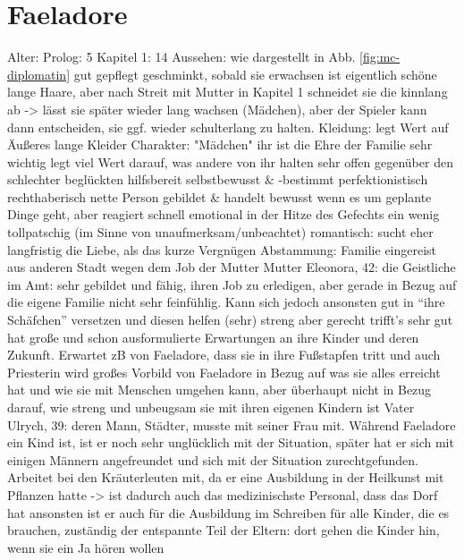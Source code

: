\section{Faeladore} \label{sec:mc-diplomatin}
\begin{outline}
	\1 Alter:
		\2 Prolog: 5
		\2 Kapitel 1: 14
	\1 Aussehen:
		\2 wie dargestellt in Abb. \ref{fig:mc-diplomatin} 
		\2 gut gepflegt 
		\2 geschminkt, sobald sie erwachsen ist
		\2 eigentlich schöne lange Haare, aber nach Streit mit Mutter in Kapitel 1 schneidet sie die kinnlang ab -> lässt sie später wieder lang wachsen (Mädchen), aber der Spieler kann dann entscheiden, sie ggf. wieder schulterlang zu halten. 
	\1 Kleidung:
		\2 legt Wert auf Äußeres
		\2 lange Kleider
	\1 Charakter:
		\2 "Mädchen"
		\2 ihr ist die Ehre der Familie sehr wichtig 
		\2 legt viel Wert darauf, was andere von ihr halten 
		\2 sehr offen gegenüber den schlechter beglückten
		\2 hilfsbereit
		\2 selbstbewusst \& -bestimmt
		\2 perfektionistisch
		\2 rechthaberisch
		\2 nette Person
		\2 gebildet \& handelt bewusst wenn es um geplante Dinge geht, aber reagiert schnell emotional in der Hitze des Gefechts
		\2 ein wenig tollpatschig (im Sinne von unaufmerksam/unbeachtet)
		\2 romantisch: sucht eher langfristig die Liebe, als das kurze Vergnügen
	\1 Abstammung:
		\2 Familie
			\3 eingereist aus anderen Stadt wegen dem Job der Mutter
		\2 Mutter Eleonora, 42:
			\3 die Geistliche im Amt: sehr gebildet und fähig, ihren Job zu erledigen, aber gerade in Bezug auf die eigene Familie nicht sehr feinfühlig. Kann sich jedoch ansonsten gut in "`ihre Schäfchen"' versetzen und diesen helfen
			\3 (sehr) streng aber gerecht trifft's sehr gut
			\3 hat große und schon ausformulierte Erwartungen an ihre Kinder und deren Zukunft. Erwartet zB von Faeladore, dass sie in ihre Fußstapfen tritt und auch Priesterin wird
			\3 großes Vorbild von Faeladore in Bezug auf was sie alles erreicht hat und wie sie mit Menschen umgehen kann, aber überhaupt nicht in Bezug darauf, wie streng und unbeugsam sie mit ihren eigenen Kindern ist
		\2 Vater Ulrych, 39: 
			\3 deren Mann, Städter, musste mit seiner Frau mit. Während Faeladore ein Kind ist, ist er noch sehr unglücklich mit der Situation, später hat er sich mit einigen Männern angefreundet und sich mit der Situation zurechtgefunden. 
			\3 Arbeitet bei den Kräuterleuten mit, da er eine Ausbildung in der Heilkunst mit Pflanzen hatte -> ist dadurch auch das medizinischste Personal, dass das Dorf hat
			\3 ansonsten ist er auch für die Ausbildung im Schreiben für alle Kinder, die es brauchen, zuständig
			\3 der entspannte Teil der Eltern: dort gehen die Kinder hin, wenn sie ein Ja hören wollen

\end{outline}
